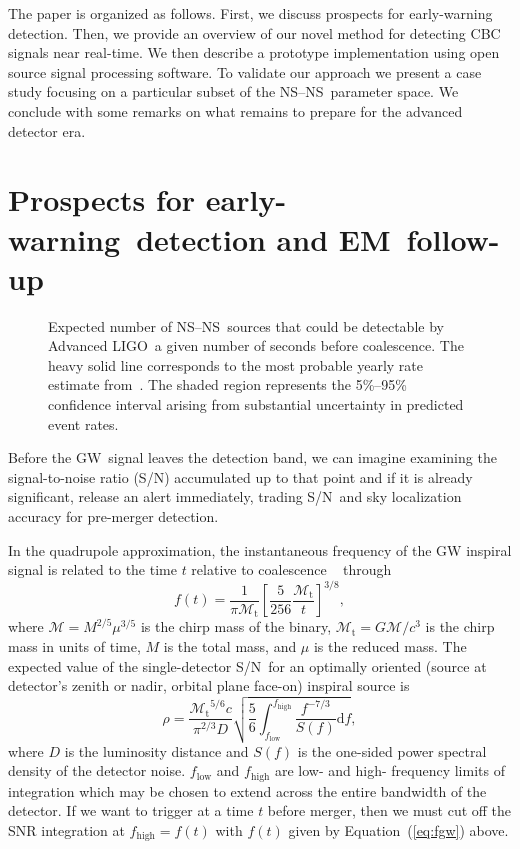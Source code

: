 \documentclass[preprint2]{aastex}
\newcommand{\earlywarning}{early-warning}
\newcommand{\NS}{NS}
\newcommand{\GW}{GW}%
\newcommand{\EM}{EM}%
\newcommand{\LIGO}{LIGO}%
\newcommand{\SNR}{S/N}%
\begin{document}
The paper is organized as follows.  First, we discuss prospects for
early-warning detection.  Then, we provide an overview of our novel
method for detecting CBC signals near real-time.
We then describe a prototype implementation using open source signal
processing software.  To validate our approach we present a case study
focusing on a particular subset of the \NS--\NS\ parameter space.  We
conclude with some remarks on what remains to prepare for the advanced
detector era.

\section{Prospects for \earlywarning\ detection and \EM\ follow-up}

\begin{figure}[h]
\caption{\label{fig:earlywarning}Expected number of \NS--\NS\
sources that could be detectable by Advanced \LIGO\ a given number of seconds
before coalescence.  The heavy solid line corresponds to the most probable yearly rate
estimate from~\citet{Abadie:2010p10836}.  The shaded region represents the 5\%--95\% confidence interval
arising from substantial uncertainty in predicted event rates.}
\end{figure}
%
Before the \GW\ signal leaves the detection band, we can imagine examining the
signal-to-noise ratio (\SNR) accumulated up to that point and if it is
already significant, release an alert immediately, trading \SNR\ and sky
localization accuracy for pre-merger detection.

In the quadrupole approximation, the instantaneous frequency of the GW inspiral signal is related to the time $t$ relative to coalescence ~\citep[section 5.1 of][]{livrev12} through
%
\begin{equation} \label{eq:fgw}
	f(t) = \frac{1}{\pi \mathcal{M}_\mathrm{t}}
		\left[ \frac{5}{256}\frac{\mathcal{M}_\mathrm{t}}{t} \right]^{3/8},
\end{equation}
%
where $\mathcal{M}=M^{2/5} \mu^{3/5}$ is the chirp mass of the binary, $\mathcal{M}_\mathrm{t}=G \mathcal{M} / c^3$ is the chirp mass in units of time, $M$ is the total mass, and $\mu$ is the reduced mass. 
The expected value of the single-detector \SNR\ for an optimally oriented (source at detector's zenith or nadir, orbital plane face-on) inspiral source is~\citep{Abadie:2010p10836}
%
\begin{equation}
	\label{eq:expected-snr}
	\rho =
		\frac{{\mathcal{M}_\mathrm{t}}^{5/6} c}{\pi^{2/3} D}
		\sqrt{
			\frac{5}{6} \int_{f_\mathrm{low}}^{f_\mathrm{high}}
			\frac{f^{-7/3}}{S(f)} \mathrm{d}f},
\end{equation}
%
where $D$ is the luminosity distance and $S(f)$ is the one-sided power spectral density of the detector noise.  $f_\mathrm{low}$ and $f_\mathrm{high}$ are low- and high- frequency limits of integration which may be chosen to extend across the entire bandwidth of the detector.  If we want to trigger at a time $t$ before merger, then we must cut off the SNR integration at $f_\mathrm{high} = f(t)$ with $f(t)$ given by Equation~(\ref{eq:fgw}) above.
\end{document}
